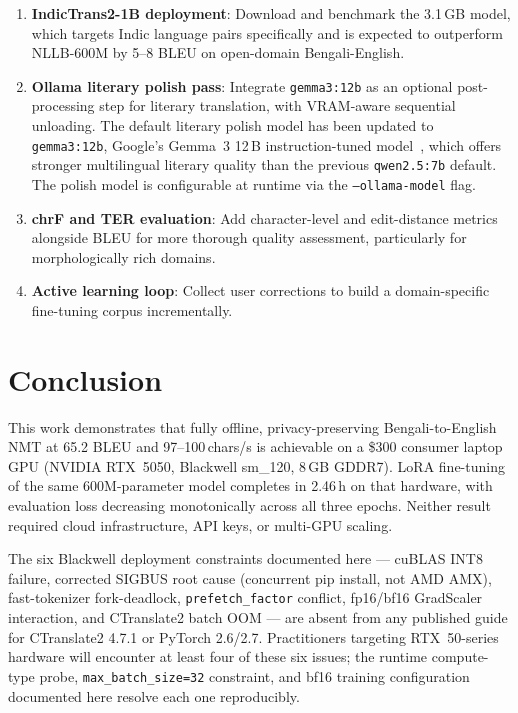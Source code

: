 \documentclass[conference]{IEEEtran}
\newcommand{\TRAINDURATION}{2.46\,h}
\begin{document}
\begin{enumerate}
  \item \textbf{IndicTrans2-1B deployment}: Download and benchmark the 3.1\,GB model,
        which targets Indic language pairs specifically and is expected to
        outperform NLLB-600M by 5--8 BLEU on open-domain Bengali-English.

  \item \textbf{Ollama literary polish pass}: Integrate \texttt{gemma3:12b} as an
        optional post-processing step for literary translation, with VRAM-aware
        sequential unloading.
        The default literary polish model has been updated to \texttt{gemma3:12b},
        Google's Gemma~3 12\,B instruction-tuned model~\cite{gemma2025}, which offers
        stronger multilingual literary quality than the previous \texttt{qwen2.5:7b} default.
        The polish model is configurable at runtime via the \texttt{--ollama-model} flag.

  \item \textbf{chrF and TER evaluation}: Add character-level and edit-distance
        metrics alongside BLEU for more thorough quality assessment,
        particularly for morphologically rich domains.

  \item \textbf{Active learning loop}: Collect user corrections to build a
        domain-specific fine-tuning corpus incrementally.
\end{enumerate}

\section{Conclusion}

This work demonstrates that fully offline, privacy-preserving Bengali-to-English NMT
at 65.2 BLEU and 97--100\,chars/s is achievable on a \$300 consumer laptop GPU
(NVIDIA RTX~5050, Blackwell sm\_120, 8\,GB GDDR7).
LoRA fine-tuning of the same 600M-parameter model completes in \TRAINDURATION{} on
that hardware, with evaluation loss decreasing monotonically across all three epochs.
Neither result required cloud infrastructure, API keys, or multi-GPU scaling.

The six Blackwell deployment constraints documented here --- cuBLAS INT8 failure,
corrected SIGBUS root cause (concurrent pip install, not AMD AMX), fast-tokenizer
fork-deadlock, \texttt{prefetch\_factor} conflict, fp16/bf16 GradScaler interaction,
and CTranslate2 batch OOM --- are absent from any published guide for CTranslate2 4.7.1
or PyTorch 2.6/2.7. Practitioners targeting RTX~50-series hardware will encounter at
least four of these six issues; the runtime compute-type probe, \texttt{max\_batch\_size=32}
constraint, and bf16 training configuration documented here resolve each one
reproducibly.
\end{document}
